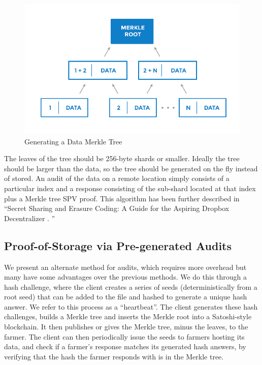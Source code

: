 \documentclass[a4paper,10pt]{article}
\begin{document}
\begin{figure}[hbt]
\centering
\includegraphics[width=\linewidth]{2}
\caption{Generating a Data Merkle Tree}
\end{figure}

 The leaves of the tree should be 256-byte shards or smaller. Ideally the tree should be larger than the data, so the tree should be generated on the fly instead of stored. An audit of the data on a remote location simply consists of a particular index and a response consisting of the sub-shard located at that index plus a Merkle tree SPV proof. This algorithm has been further described in “Secret Sharing and Erasure Coding: A Guide for the Aspiring Dropbox Decentralizer \cite{16}. ”  \\


\subsection{Proof-of-Storage via Pre-generated Audits}
We present an alternate method for audits, which requires more overhead but many have some advantages over the previous methods. We do this through a hash challenge, where the client creates a series of seeds (deterministically from a root seed) that can be added to the file and hashed to generate a unique hash answer. We refer to this process as a “heartbeat”. The client generates these hash challenges, builds a Merkle tree \cite{2} and inserts the Merkle root into a Satoshi-style blockchain. It then publishes or gives the Merkle tree, minus the leaves, to the farmer. The client can then periodically issue the seeds to farmers hosting its data, and check if a farmer’s response matches its generated hash answers, by verifying that the hash the farmer responds with is in the Merkle tree. \\
\end{document}
